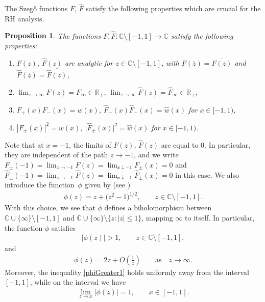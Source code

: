 \documentclass[11pt]{article}
\numberwithin{equation}{section}
\newcommand{\R}{\mathbb{R}}
\newcommand{\C}{\mathbb{C}}
\newcommand{\hw}{\widehat w}
\newcommand{\hF}{\widehat F}
\newtheorem{Proposition}[Theorem]{Proposition}
 { \theoremstyle{definition}
\newtheorem{Definition}[Theorem]{Definition}
\newtheorem{Note}[Theorem]{Note}
\newtheorem{Example}[Theorem]{Example}
\newtheorem{Remark}[Theorem]{Remark} }
\numberwithin{equation}{section}
\begin{document}
The Szeg\H{o} functions $F$, $\hF$ satisfy the following properties which are crucial for the RH analysis.

\begin{Proposition}\label{PropertiesF}
The functions $F, \hF \colon \C \setminus [-1,1]\to \C$ satisfy the following properties:
\begin{enumerate}[$(i)$]\itemsep=0pt
 \item $F(z)$, $\hF(z)$ are analytic for $z \in \C \setminus [-1,1]$, with $F(\overline{z}) = \overline{F(z)}$ and $\hF(\overline{z}) = \overline{\hF(z)}$,
 \item $\lim_{z\to\infty} F(z) = F_\infty \in \R_+$, $\lim_{z\to\infty} \hF(z) = \widehat F_\infty \in \R_+$,
 \item $F_+(x)F_-(x) = w(x)$, $\hF_+(x)\hF_-(x) = \hw(x)$ for $x \in [-1,1)$,
 \item $|F_\pm(x)|^2 = w(x)$, $\big|\hF_\pm(x)\big|^2 = \hw(x)$ for $x \in [-1,1)$.
\end{enumerate}
\end{Proposition}
Note that at $x = -1$, the limits of $F(z)$, $\hF(z)$ are equal to $0$. In particular, they are independent of the path $z \to -1$, and we write $F_\pm(-1) = \lim_{z\to -1} F(z) = \lim_{x \downarrow -1} F_\pm(x) = 0$ and $\hF_\pm(-1) = \lim_{z\to -1} \hF(z) = \lim_{x \downarrow -1} \hF_\pm(x) = 0$ in this case.
We also introduce the function~$\phi$ given by (see \cite[Proposition~2.1]{CD})
\begin{align*}
 \phi(z) = z + \big(z^2-1\big)^{1/2}, \qquad z \in \C \setminus [-1,1].
\end{align*}
With this choice, we see that $\phi$ defines a biholomorphism between $\C \cup\lbrace \infty \rbrace \setminus [-1,1]$ and ${\C \cup \lbrace \infty \rbrace \setminus \lbrace z\colon |z| \leq 1 \rbrace}$, mapping $\infty$ to itself. In particular, the function $\phi$ satisfies
\begin{align}\label{phiGreater1}
 |\phi(z)| > 1, \qquad z \in \C \setminus [-1,1],
\end{align}
and
\begin{align*}
 \phi(z) = 2z + O\left(\frac{1}{z}\right) \qquad \mbox{as}\quad z \to \infty.
\end{align*}
Moreover, the inequality \eqref{phiGreater1} holds uniformly away from the interval $[-1,1]$, while on the interval we have
\begin{align}\label{PhionInterval}
 \lim_{z\to x}|\phi(z)| = 1, \qquad x\in[-1,1].
\end{align}
\end{document}
